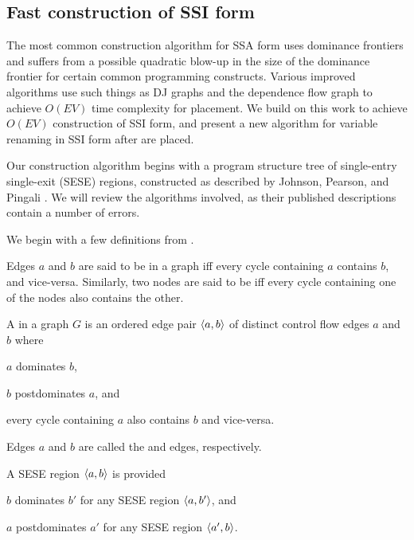 \documentclass[12pt,titlepage,twoside]{article}
\begin{document}
\subsection{Fast construction of SSI form}
The most common construction algorithm for SSA form
\cite{cytron91:ssa} uses dominance frontiers and suffers from a
possible quadratic blow-up in the size of the dominance frontier for
certain common programming constructs.  Various improved algorithms
use such things as DJ graphs \cite{sreedhar95:lintime} and the
dependence flow graph \cite{johnson93:dfg} to achieve $O(EV)$ time
complexity for \phifunction placement.  We build on this work to
achieve $O(EV)$ construction of SSI form, and present a new algorithm
for variable renaming in SSI form after  are placed.

Our construction algorithm begins with a program structure tree of
single-entry single-exit (SESE) regions, constructed as described by
Johnson, Pearson, and Pingali \cite{johnson94:pst}.  We will review
the algorithms involved, as their published descriptions
\cite{johnson93:sese} contain a number of errors.

We begin with a few definitions from \cite{johnson94:pst}.
\begin{definition}
Edges $a$ and $b$ are said to be  in a
graph iff every cycle containing $a$ contains $b$, and vice-versa.
Similarly, two nodes are said to be  iff
every cycle containing one of the nodes also contains the other.
\end{definition}
\begin{definition}
A  in a graph $G$ is an ordered edge pair
$\left\langle a,b \right\rangle$ of distinct control flow edges $a$ and $b$ where
\begin{tightenum}
\item $a$ dominates $b$,
\item $b$ postdominates $a$, and
\item every cycle containing $a$ also contains $b$ and vice-versa.
\end{tightenum}
Edges $a$ and $b$ are called the  and  edges,
respectively.
\end{definition}
\begin{definition}
A SESE region $\left\langle a,b \right\rangle$ is  provided
\begin{tightenum}
\item $b$ dominates $b'$ for any SESE region $\left\langle a,b' \right\rangle$, and
\item $a$ postdominates $a'$ for any SESE region $\left\langle a',b \right\rangle$.
\end{tightenum}
\end{definition}
\end{document}
